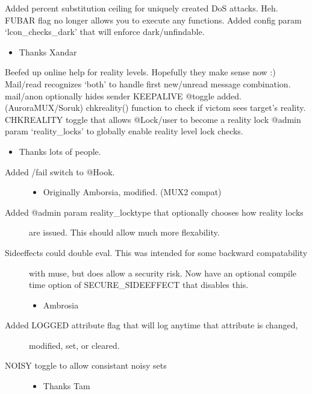 \documentclass[letterpaper,10pt,english]{sphinxmanual}
\begin{document}
\sphinxAtStartPar
Added percent substitution ceiling for uniquely created DoS attacks.  Heh.
FUBAR flag no longer allows you to execute any functions.
Added config param ‘lcon\_checks\_dark’ that will enforce dark/unfindable.
\begin{itemize}
\item {} 
\sphinxAtStartPar
Thanks Xandar

\end{itemize}

\sphinxAtStartPar
Beefed up on\sphinxhyphen{}line help for reality levels.  Hopefully they make sense now :)
Mail/read recognizes ‘both’ to handle first new/unread message combination.
mail/anon optionally hides sender
KEEPALIVE @toggle added. \sphinxhyphen{} (AuroraMUX/Soruk)
chkreality() function to check if victom sees target’s reality.
CHKREALITY toggle that allows @Lock/user to become a reality lock
@admin param ‘reality\_locks’ to globally enable reality level lock checks.
\begin{itemize}
\item {} 
\sphinxAtStartPar
Thanks lots of people.

\end{itemize}
\begin{description}
\item[{Added /fail switch to @Hook.}] \leavevmode\begin{itemize}
\item {} 
\sphinxAtStartPar
Originally Amborsia, modified. (MUX2 compat)

\end{itemize}

\item[{Added @admin param reality\_locktype that optionally chooses how reality locks}] \leavevmode
\sphinxAtStartPar
are issued.  This should allow much more flexability.

\item[{Sideeffects could double eval.  This was intended for some backward compatability}] \leavevmode
\sphinxAtStartPar
with muse, but does allow a security risk.  Now have an optional compile
time option of SECURE\_SIDEEFFECT that disables this.
\begin{itemize}
\item {} 
\sphinxAtStartPar
Ambrosia

\end{itemize}

\item[{Added LOGGED attribute flag that will log anytime that attribute is changed,}] \leavevmode
\sphinxAtStartPar
modified, set, or cleared.

\item[{NOISY toggle to allow consistant noisy sets}] \leavevmode\begin{itemize}
\item {} 
\sphinxAtStartPar
Thanks Tam

\end{itemize}

\end{description}
\end{document}
